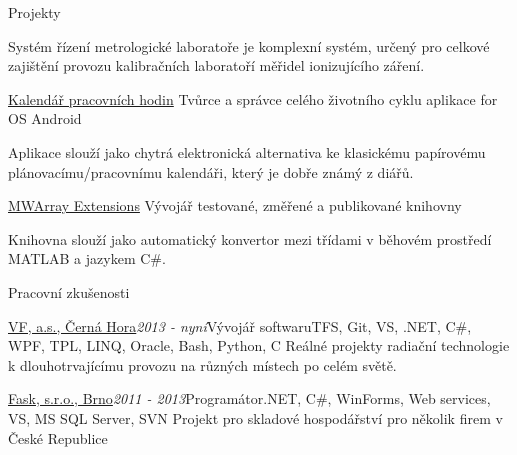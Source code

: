 \documentclass{cv} %
\begin{document}
\begin{rSection}{Projekty}
\begin{rSubsection}
Systém řízení metrologické laboratoře je komplexní systém, určený pro celkové zajištění provozu kalibračních laboratoří měřidel ionizujícího záření.
\end{rSubsection}

\begin{rSubsection}
{\href{https://play.google.com/store/apps/details?id=eu.jksoft.planningcalendar}{Kalendář pracovních hodin}}{}
{Tvůrce a správce celého životního cyklu aplikace for OS Android}{}

Aplikace slouží jako chytrá elektronická alternativa ke klasickému papírovému plánovacímu/pracovnímu kalendáři, který je dobře známý z diářů.
\end{rSubsection}

\begin{rSubsection}
{\href{http://honzakuzel.eu/mwarrayextensions.html}{MWArray Extensions}}{}
{Vývojář testované, změřené a publikované knihovny}{}

Knihovna slouží jako automatický konvertor mezi třídami v běhovém prostředí MATLAB a jazykem C\#.
\end{rSubsection}

\end{rSection}


\begin{rSection}{Pracovní zkušenosti}

\begin{rSubsection}{\href{https://www.vfnuclear.com/cz/}{VF, a.s., \v Cern\' a Hora}}{\em 2013 - nyní}{Vývojář softwaru}{TFS, Git, VS, .NET, C\#, WPF, TPL, LINQ, Oracle, Bash, Python, C}
Reálné projekty radiační technologie k dlouhotrvajícímu provozu na různých místech po celém světě.
\end{rSubsection}

\begin{rSubsection}{\href{http://www.fask.cz/}{Fask, s.r.o., Brno}}{\em 2011 - 2013}{Programátor}{.NET, C\#, WinForms, Web services, VS, MS SQL Server, SVN}
Projekt pro skladové hospodářství pro několik firem v České Republice
\end{rSubsection}

\end{rSection}
\end{document}
